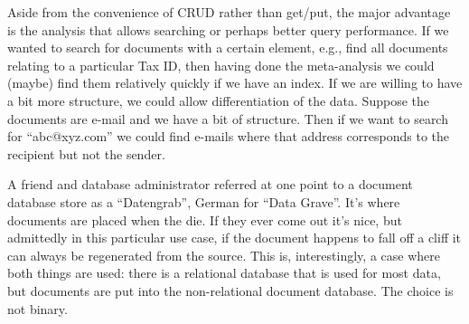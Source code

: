 Aside from the convenience of CRUD rather than get/put, the major advantage is the analysis that allows searching or perhaps better query performance. If we wanted to search for documents with a certain element, e.g., find all documents relating to a particular Tax ID, then having done the meta-analysis we could (maybe) find them relatively quickly if we have an index. If we are willing to have a bit more structure, we could allow differentiation of the data. Suppose the documents are e-mail and we have a bit of structure. Then if we want to search for ``abc@xyz.com'' we could find e-mails where that address corresponds to the recipient but not the sender.

A friend and database administrator referred at one point to a document database store as a ``Datengrab'', German for ``Data Grave''. It's where documents are placed when the die. If they ever come out it's nice, but admittedly in this particular use case, if the document happens to fall off a cliff it can always be regenerated from the source. This is, interestingly, a case where both things are used: there is a relational database that is used for most data, but documents are put into the non-relational document database. The choice is not binary.




